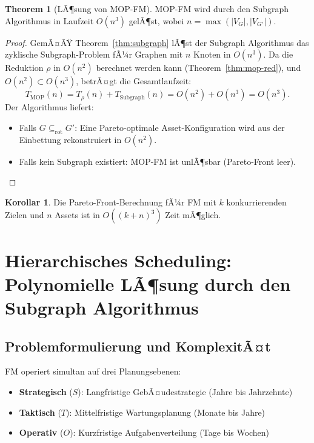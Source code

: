 ﻿\documentclass[a4paper,12pt]{article}
\theoremstyle{definition}
\newtheorem{korollar}{Korollar}[section]
\newtheorem{theorem}{Theorem}[section]
\begin{document}
\begin{theorem}[LÃ¶sung von MOP-FM]
\label{thm:mop-sol}
MOP-FM wird durch den Subgraph Algorithmus in Laufzeit $O(n^3)$ gelÃ¶st,
wobei $n = \max(|V_G|, |V_{G'}|)$.
\end{theorem}

\begin{proof}
GemÃ¤ÃŸ Theorem~\ref{thm:subgraph} lÃ¶st der Subgraph Algorithmus das zyklische
Subgraph-Problem fÃ¼r Graphen mit $n$ Knoten in $O(n^3)$.
Da die Reduktion $\rho$ in $O(n^2)$ berechnet werden kann
(Theorem~\ref{thm:mop-red}), und $O(n^2) \subset O(n^3)$, betrÃ¤gt die
Gesamtlaufzeit:
\[
    T_{\mathrm{MOP}}(n) = T_\rho(n) + T_{\mathrm{Subgraph}}(n) = O(n^2) + O(n^3) = O(n^3).
\]
Der Algorithmus liefert:
\begin{itemize}
    \item Falls $G \subseteq_{\mathrm{rot}} G'$: Eine Pareto-optimale Asset-Konfiguration
          wird aus der Einbettung rekonstruiert in $O(n^2)$.
    \item Falls kein Subgraph existiert: MOP-FM ist unlÃ¶sbar (Pareto-Front leer).
\end{itemize}
\end{proof}

\begin{korollar}
\label{kor:mop}
Die Pareto-Front-Berechnung fÃ¼r FM mit $k$ konkurrierenden Zielen und $n$ Assets
ist in $O((k+n)^3)$ Zeit mÃ¶glich.
\end{korollar}

\section{Hierarchisches Scheduling: Polynomielle LÃ¶sung durch den Subgraph Algorithmus}
\label{sec:scheduling}

\subsection{Problemformulierung und KomplexitÃ¤t}

FM operiert simultan auf drei Planungsebenen:
\begin{itemize}
    \item \textbf{Strategisch} ($S$): Langfristige GebÃ¤udestrategie (Jahre bis Jahrzehnte)
    \item \textbf{Taktisch} ($T$): Mittelfristige Wartungsplanung (Monate bis Jahre)
    \item \textbf{Operativ} ($O$): Kurzfristige Aufgabenverteilung (Tage bis Wochen)
\end{itemize}
\end{document}
